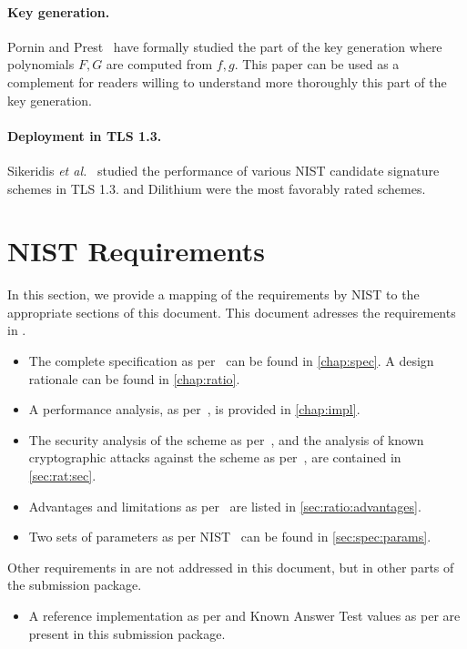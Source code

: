 \paragraph{Key generation.} Pornin and Prest~\cite{PKC:PorPre19} have formally studied the part of the key generation where polynomials $F,G$ are computed from $f,g$.
This paper can be used as a complement for readers willing to understand more thoroughly this part of the key generation.

\paragraph{Deployment in TLS 1.3.} Sikeridis \textit{et al.}~\cite{NDSS:SikKamDev20} studied the performance of various NIST candidate signature schemes in TLS 1.3. \falcon and Dilithium were the most favorably rated schemes.

\section{NIST Requirements}

In this section, we provide a mapping of the requirements by NIST to the appropriate sections of this document. This document adresses the requirements in \cite[Section 2.B]{NIST}.
 \begin{itemize}
  \item The complete specification as per~\cite[Section 2.B.1]{NIST} can be found in \cref{chap:spec}. A design rationale can be found in \cref{chap:ratio}.
  \item A performance analysis, as per~\cite[Section 2.B.2]{NIST}, is provided in \cref{chap:impl}.
  \item The security analysis of the scheme as per~\cite[Section 2.B.4]{NIST}, and the analysis of known cryptographic attacks against the scheme as per~\cite[Section 2.B.5]{NIST}, are contained in \cref{sec:rat:sec}.
  \item Advantages and limitations as per~\cite[Section 2.B.6]{NIST} are listed in \cref{sec:ratio:advantages}.
  \item Two sets of parameters as per NIST~\cite[Section 4.A.5]{NIST} can be found in \cref{sec:spec:params}.
 \end{itemize}

 Other requirements in \cite{NIST} are not addressed in this document, but in other parts of the submission package.
 \begin{itemize}
 \item
 A reference implementation as per \cite[Section 2.C.1]{NIST} and Known Answer Test values as per \cite[Section 2.B.2]{NIST} are present in this submission package.
 \end{itemize}

